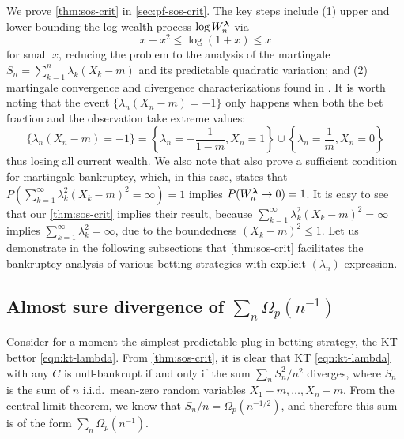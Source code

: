 We prove \cref{thm:sos-crit} in \cref{sec:pf-sos-crit}. The key steps include (1)
upper and lower bounding the log-wealth process $\log W_n^{\boldsymbol{\lambda}}$ via
\begin{equation}
 x - x^2 \le \log(1+x) \le x
\end{equation}
for small $x$, reducing the problem to the analysis of the martingale $S_n= \sum_{k=1}^n \lambda_k(X_k - m)$ and its predictable quadratic variation;
and (2) martingale convergence and divergence characterizations found in \cite{hall2014martingale,Fitzsimmonslecturenotes}. 
It is worth noting that the event $\{ \lambda_n(X_n - m) = -1 \} $ only happens when both the bet fraction and the observation take extreme values:
\begin{equation}
     \{ \lambda_n(X_n - m) = -1 \}  = \left\{ \lambda_n = -\frac{1}{1-m}, X_n = 1 \right\} \cup \left\{ \lambda_n = \frac{1}{m}, X_n = 0 \right\}
\end{equation}
thus losing all current wealth.
We also note that \citet[Lemma 33]{ramdas2020admissible} also prove a sufficient condition for martingale bankruptcy, which, in this case, states that $P(\sum_{k=1}^\infty \lambda_k^2(X_k - m)^2 =\infty ) = 1$ implies $P(W_n^{\boldsymbol{\lambda}} \to 0) = 1$. It is easy to see that our \cref{thm:sos-crit} implies their result, because $\sum_{k=1}^\infty \lambda_k^2(X_k - m)^2 =\infty$ implies $\sum_{k=1}^\infty \lambda_k^2 =\infty$, due to the boundedness $(X_k - m)^2 \le 1$.
Let us demonstrate in the following subsections that \cref{thm:sos-crit} facilitates the bankruptcy analysis of various betting strategies with explicit $(\lambda_n)$ expression. 




\subsection{Almost sure divergence of $\sum_n \Omega_p(n^{-1})$}

Consider for a moment the simplest predictable plug-in betting strategy, the KT bettor \eqref{eqn:kt-lambda}.
From \cref{thm:sos-crit}, it is clear that KT \eqref{eqn:kt-lambda} with any $C$ is null-bankrupt if and only if the sum $\sum_n S_n^2/n^2$ diverges, where $S_n$ is the sum of $n$ i.i.d.\ mean-zero random variables $X_1 - m, \dots, X_n - m$. From the central limit theorem, we know that $S_n/n = \Omega_p(n^{-1/2})$, and therefore this sum is of the form $\sum_n \Omega_p(n^{-1})$. 

